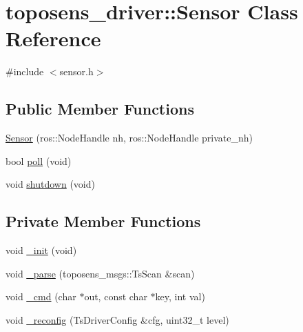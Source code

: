 \hypertarget{classtoposens__driver_1_1Sensor}{}\section{toposens\+\_\+driver\+:\+:Sensor Class Reference}
\label{classtoposens__driver_1_1Sensor}


{\ttfamily \#include $<$sensor.\+h$>$}

\subsection*{Public Member Functions}
\begin{DoxyCompactItemize}
\item 
\hyperlink{classtoposens__driver_1_1Sensor_ab14040539bf943fcfb95d613ace04f80}{Sensor} (ros\+::\+Node\+Handle nh, ros\+::\+Node\+Handle private\+\_\+nh)
\item 
bool \hyperlink{classtoposens__driver_1_1Sensor_a926de2fe6169b81fb456d2a8d726cebe}{poll} (void)
\item 
void \hyperlink{classtoposens__driver_1_1Sensor_a1a568d4c7946731b20c3f81a3c67a566}{shutdown} (void)
\end{DoxyCompactItemize}
\subsection*{Private Member Functions}
\begin{DoxyCompactItemize}
\item 
void \hyperlink{classtoposens__driver_1_1Sensor_a6ba202a85c681960ce9b31498a942826}{\+\_\+init} (void)
\item 
void \hyperlink{classtoposens__driver_1_1Sensor_a662f061f7fd3181f0ca5527d6f244b6d}{\+\_\+parse} (toposens\+\_\+msgs\+::\+Ts\+Scan \&scan)
\item 
void \hyperlink{classtoposens__driver_1_1Sensor_af20095b07e82801d7827e34622fd604f}{\+\_\+cmd} (char $\ast$out, const char $\ast$key, int val)
\item 
void \hyperlink{classtoposens__driver_1_1Sensor_ab60154cabae56a4ab05230b4fd6222dd}{\+\_\+reconfig} (Ts\+Driver\+Config \&cfg, uint32\+\_\+t level)
\end{DoxyCompactItemize}
